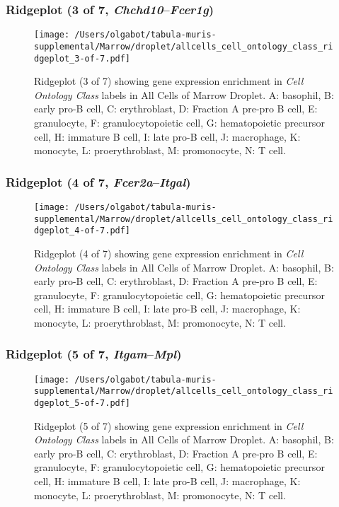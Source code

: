 \clearpage

\subsubsection{Ridgeplot (3 of 7, \emph{Chchd10}--\emph{Fcer1g})}
\begin{figure}[h]
\centering
\texttt{[image: /Users/olgabot/tabula-muris-supplemental/Marrow/droplet/allcells\_cell\_ontology\_class\_ridgeplot\_3-of-7.pdf]}

\caption{ Ridgeplot (3 of 7)  showing gene expression enrichment in \emph{Cell Ontology Class} labels in All Cells of Marrow Droplet. A: basophil, B: early pro-B cell, C: erythroblast, D: Fraction A pre-pro B cell, E: granulocyte, F: granulocytopoietic cell, G: hematopoietic precursor cell, H: immature B cell, I: late pro-B cell, J: macrophage, K: monocyte, L: proerythroblast, M: promonocyte, N: T cell.}
\end{figure}


\clearpage

\subsubsection{Ridgeplot (4 of 7, \emph{Fcer2a}--\emph{Itgal})}
\begin{figure}[h]
\centering
\texttt{[image: /Users/olgabot/tabula-muris-supplemental/Marrow/droplet/allcells\_cell\_ontology\_class\_ridgeplot\_4-of-7.pdf]}

\caption{ Ridgeplot (4 of 7)  showing gene expression enrichment in \emph{Cell Ontology Class} labels in All Cells of Marrow Droplet. A: basophil, B: early pro-B cell, C: erythroblast, D: Fraction A pre-pro B cell, E: granulocyte, F: granulocytopoietic cell, G: hematopoietic precursor cell, H: immature B cell, I: late pro-B cell, J: macrophage, K: monocyte, L: proerythroblast, M: promonocyte, N: T cell.}
\end{figure}


\clearpage

\subsubsection{Ridgeplot (5 of 7, \emph{Itgam}--\emph{Mpl})}
\begin{figure}[h]
\centering
\texttt{[image: /Users/olgabot/tabula-muris-supplemental/Marrow/droplet/allcells\_cell\_ontology\_class\_ridgeplot\_5-of-7.pdf]}

\caption{ Ridgeplot (5 of 7)  showing gene expression enrichment in \emph{Cell Ontology Class} labels in All Cells of Marrow Droplet. A: basophil, B: early pro-B cell, C: erythroblast, D: Fraction A pre-pro B cell, E: granulocyte, F: granulocytopoietic cell, G: hematopoietic precursor cell, H: immature B cell, I: late pro-B cell, J: macrophage, K: monocyte, L: proerythroblast, M: promonocyte, N: T cell.}
\end{figure}


